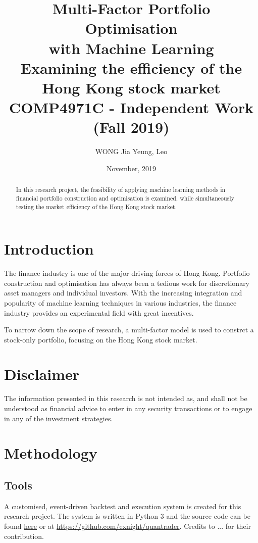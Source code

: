 \documentclass[12pt]{article}
\title{Multi-Factor Portfolio Optimisation \\ with Machine Learning \\[2ex]
  \large Examining the efficiency of the Hong Kong stock market \\[4ex]
  \large COMP4971C - Independent Work (Fall 2019)}
\author{WONG Jia Yeung, Leo}
\date{November, 2019}
\begin{document}
\begin{titlingpage}
  \maketitle
  \begin{abstract}
    In this research project, the feasibility of applying machine learning methods in financial portfolio construction and optimisation is examined, while simultaneously testing the market efficiency of the Hong Kong stock market.
  \end{abstract}
\end{titlingpage}


\tableofcontents

\section{Introduction}

The finance industry is one of the major driving forces of Hong Kong. Portfolio construction and optimisation has always been a tedious work for discretionary asset managers and individual investors. With the increasing integration and popularity of machine learning techniques in various industries, the finance industry provides an experimental field with great incentives.

To narrow down the scope of research, a multi-factor model is used to constrct a stock-only portfolio, focusing on the Hong Kong stock market.

\section{Disclaimer}

The information presented in this research is not intended as, and shall not be understood as financial advice to enter in any security transactions or to engage in any of the investment strategies.

\section{Methodology}

\subsection{Tools}

A customised, event-driven backtest and execution system is created for this research project. The system is written in Python 3 and the source code can be found \href{https://github.com/exnight/quantrader}{here} or at \url{https://github.com/exnight/quantrader}. Credits to ... for their contribution.
\end{document}
